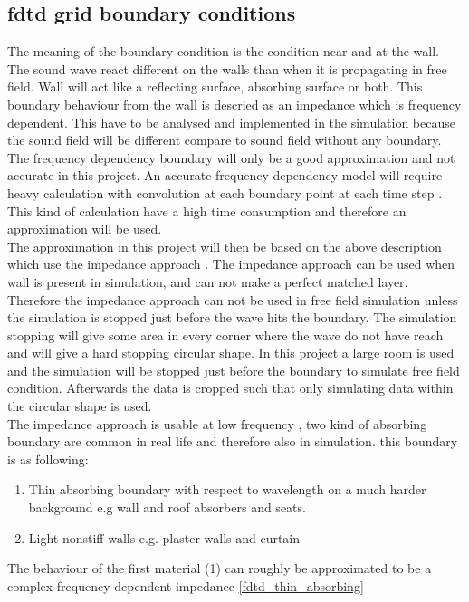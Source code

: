 \subsection{\gls{fdtd} grid boundary conditions}        
The meaning of the boundary condition is the condition near and at the wall. The sound wave react different on the walls than when it is propagating in free field. Wall will act like a reflecting surface, absorbing surface or both. This boundary behaviour from the wall is descried as an impedance which is frequency dependent. This have to be analysed and implemented in the simulation because the sound field will be different compare to sound field without any boundary. The frequency dependency boundary will only be a good approximation and not accurate in this project. An accurate frequency dependency model will require heavy calculation with convolution at each boundary point at each time step \citep{finiteproblems}. This kind of calculation have a high time consumption and therefore an approximation will be used. \\
The approximation in this project will then be based on the above description which use the impedance approach \citep{FDTDmodelling}. The impedance approach can be used when wall is present in simulation, and can not make a perfect matched layer. Therefore the impedance approach can not be used in free field simulation unless the simulation is stopped just before the wave hits the boundary. The simulation stopping will give some area in every corner where the wave do not have reach and will give a hard stopping circular shape. In this project a large room is used and the simulation will be stopped just before the boundary to simulate free field condition. Afterwards the data is cropped such that only simulating data within the circular shape is used. \\

The  impedance approach is usable at low frequency \citep{FDTDmodelling}, two kind of absorbing boundary are common in real life and therefore also in simulation. this boundary is as following:

\begin{enumerate}
\item Thin absorbing boundary with respect to wavelength on a much harder background e.g wall and roof absorbers and seats.
\item Light nonstiff walls e.g. plaster walls and curtain 
\end{enumerate}


The behaviour of the first material (1) can roughly be approximated to be a complex frequency dependent impedance \autoref{fdtd_thin_absorbing}

